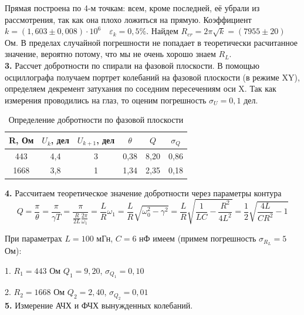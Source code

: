 \documentclass[a4paper, 12pt]{article}
\begin{document}
	
	Прямая построена по 4-м точкам: всем, кроме последней, её убрали из рассмотрения, так как она плохо ложиться на прямую. Коэффициент $k = (1,603 \pm 0,008)\cdot 10^6 \quad \varepsilon_k = 0,5 \%$. Найдем $R_{cr} = 2\pi \sqrt{k} = (7955 \pm 20)$ Ом. В пределах случайной погрешности не попадает в теоретически расчитанное значение, вероятно потому, что мы не очень хорошо знаем $R_L$.\\
	
	\textbf{3.} Рассчет добротности по спирали на фазовой плоскости. В помощью осциллографа получаем портрет колебаний на фазовой плоскости (в режиме XY), определяем декремент затухания по соседним пересечениям оси X. Так как измерения проводились на глаз, то оценим погрешность $\sigma_U = 0,1$ дел.
	
	\begin{table}[h]
		\centering
		\begin{tabular}{|c|c|c|c|c|c|}
			\hline
			R, Ом & $U_k$, дел & $U_{k + 1}$, дел & $\theta$ & $Q$ & $\sigma_{Q}$  \\ \hline
			443 & 4,4 & 3 & 0,38 & 8,20 & 0,86 \\ \hline
			1668 & 3,8 & 1 & 1,34 & 2,35 & 0,18 \\ \hline 
		\end{tabular}
		\caption{Определение добротности по фазовой плоскости}
	\end{table}
	
	\textbf{4.} Рассчитаем теоретическое значение добротности через параметры контура
	\[Q = \frac{\pi}{\theta} = \frac{\pi}{\gamma T} = \frac{\pi}{\frac{R}{2L}\frac{2\pi}{\omega_1}} = \frac{L}{R}\omega_1 = \frac{L}{R}\sqrt{\omega_0^2 - \gamma^2} = \frac{L}{R}\sqrt{\frac{1}{LC} - \frac{R^2}{4L^2}} = \frac{1}{2}\sqrt{\frac{4L}{CR^2} - 1}\]
	
	При параметрах $L = 100$ мГн, $C = 6$ нФ имеем (примем погрешность $\sigma_{R_L} = 5$ Ом):
	
	1. $R_1 = 443$ Ом $Q_1 = 9,20$, $\sigma_{Q_1} = 0,10$
	
	2. $R_2 = 1668$ Ом $Q_2 = 2,40$, $\sigma_{Q_2} = 0,01$\\
	
	\textbf{5.} Измерение АЧХ и ФЧХ вынужденных колебаний.
	
\end{document}
